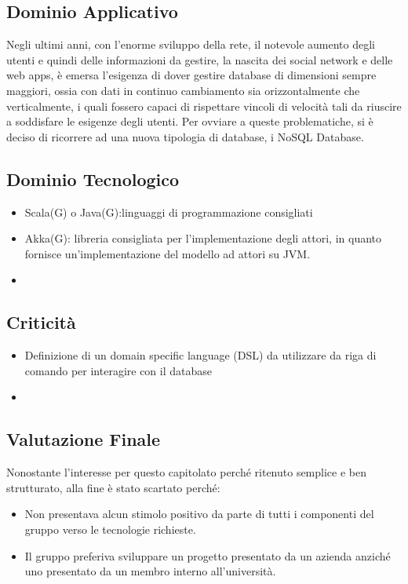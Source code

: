 \subsection{Dominio Applicativo}
Negli ultimi anni, con l'enorme sviluppo della rete, il notevole aumento degli utenti e quindi delle informazioni da gestire, la nascita dei
social network e delle web apps, è emersa l'esigenza di dover
gestire database di dimensioni sempre maggiori, ossia con dati in continuo cambiamento sia orizzontalmente che verticalmente, i quali fossero capaci di rispettare vincoli di velocità tali da riuscire a soddisfare le esigenze degli utenti.
Per ovviare a queste problematiche, si è deciso di ricorrere ad una
nuova tipologia di database, i NoSQL Database. 


\subsection{Dominio Tecnologico}
\begin{itemize}
\item
Scala(G) o Java(G):linguaggi di programmazione consigliati
\item
Akka(G): libreria consigliata per l'implementazione degli attori, in quanto fornisce un'implementazione del modello ad attori su JVM.
\item
\end{itemize}

\subsection{Criticità}
\begin{itemize}
\item
Definizione di un domain specific language (DSL) da utilizzare da riga di comando per interagire con il database
\item
\end{itemize}

\subsection{Valutazione Finale}
Nonostante l'interesse per questo capitolato perché ritenuto semplice e ben strutturato, alla fine è stato scartato perché:
\begin{itemize}
\item
Non presentava alcun stimolo positivo da parte di tutti i componenti del gruppo verso le tecnologie richieste.
\item
Il gruppo preferiva sviluppare un progetto presentato da un azienda anziché uno presentato da un membro interno all'università.
\end{itemize}